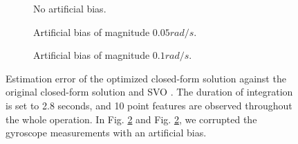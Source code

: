 \documentclass[letterpaper, 10 pt, journal, twoside]{IEEEtran}  %
\begin{document}
\begin{figure}
  \centering
  \begin{subfigure}[b]{0.7\columnwidth}
   \resizebox{\columnwidth}{!}{}
    \caption{No artificial bias.\label{fig:valid}}
  \end{subfigure}
  \begin{subfigure}[b]{0.489\columnwidth}
    \resizebox{\columnwidth}{!}{}
    \caption{Artificial bias of magnitude $0.05 rad/s$.\label{fig:validBias1}}
  \end{subfigure}
  \begin{subfigure}[b]{0.489\columnwidth}
    \resizebox{\columnwidth}{!}{}
    \caption{Artificial bias of magnitude $0.1 rad/s$.\label{fig:validBias2}}
  \end{subfigure}
  \caption{Estimation error of the optimized closed-form solution against the original closed-form solution \cite{Martinelli2014} and SVO \cite{FaesslerICRA15}.
    The duration of integration is set to 2.8 seconds, and 10 point features are observed throughout the whole operation.
    In Fig. \ref{fig:validBias1} and Fig. \ref{fig:validBias1}, we corrupted the gyroscope measurements with an artificial bias.}

\end{figure}



\end{document}
